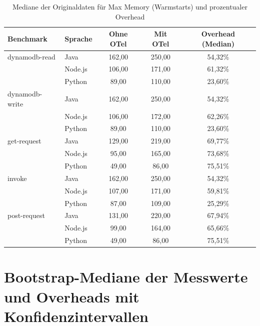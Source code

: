 \begin{table}[H]
\centering
\footnotesize
\caption{Mediane der Originaldaten für Max Memory (Warmstarts) und prozentualer Overhead}
\label{app:raw-memory-hot}
\begin{tabular}{|l|l|c|c|c|}
\hline
\textbf{Benchmark} & \textbf{Sprache} & \textbf{Ohne OTel} & \textbf{Mit OTel} & \textbf{Overhead (Median)} \\
\hline
dynamodb-read   & Java    & 162,00 & 250,00 & 54,32\% \\
                & Node.js & 106,00 & 171,00 & 61,32\% \\
                & Python  &  89,00 & 110,00 & 23,60\% \\
\hline
dynamodb-write  & Java    & 162,00 & 250,00 & 54,32\% \\
                & Node.js & 106,00 & 172,00 & 62,26\% \\
                & Python  &  89,00 & 110,00 & 23,60\% \\
\hline
get-request     & Java    & 129,00 & 219,00 & 69,77\% \\
                & Node.js &  95,00 & 165,00 & 73,68\% \\
                & Python  &  49,00 &  86,00 & 75,51\% \\
\hline
invoke          & Java    & 162,00 & 250,00 & 54,32\% \\
                & Node.js & 107,00 & 171,00 & 59,81\% \\
                & Python  &  87,00 & 109,00 & 25,29\% \\
\hline
post-request    & Java    & 131,00 & 220,00 & 67,94\% \\
                & Node.js &  99,00 & 164,00 & 65,66\% \\
                & Python  &  49,00 &  86,00 & 75,51\% \\
\hline
\end{tabular}
\end{table}

\section{Bootstrap-Mediane der Messwerte und Overheads mit Konfidenzintervallen}


